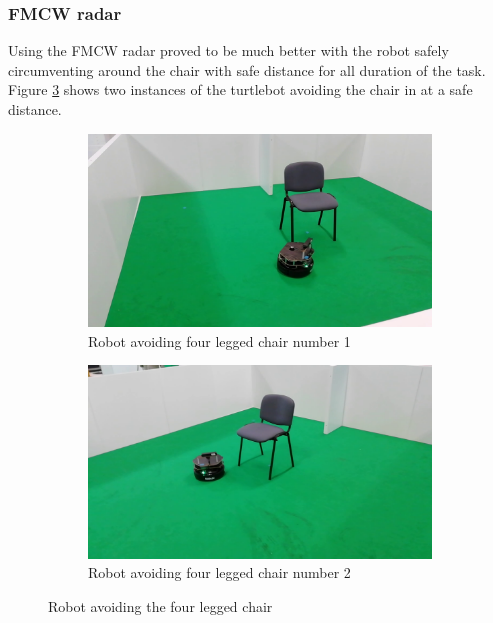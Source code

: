 \subsubsection*{FMCW radar}
Using the \ac{FMCW} radar proved to be much better with the robot safely circumventing around the chair with safe distance for all duration of the task. Figure \ref{fig:nchairRS} shows two instances of the turtlebot avoiding the chair in at a safe distance.
\begin{figure}[h!]
  \centering
  \begin{subfigure}[b]{0.49\linewidth}
    \includegraphics[width=\linewidth]{imgs/chapter5/nchairRS.png}
     \caption{Robot avoiding four legged chair number 1}
     \label{fig::wchair}
  \end{subfigure}
  \begin{subfigure}[b]{0.49\linewidth}
    \includegraphics[width=\linewidth]{imgs/chapter5/nchairRS2.png}
    \caption{Robot avoiding four legged chair number 2}
    \label{fig::nchair}
  \end{subfigure}
  \caption{Robot avoiding the four legged chair}
  \label{fig:nchairRS}
\end{figure}

